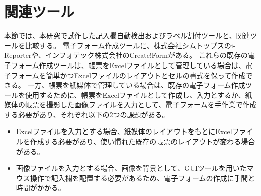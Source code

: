 






\section{関連ツール}\label{sec:relation_tools}
本節では、本研究で試作した記入欄自動検出およびラベル割付ツールと、関連ツールを比較する。
電子フォーム作成ツールに、株式会社シムトップスのi-Reporter\cite{i-Reporter}や、インフォテック株式会社のCreate!Form\cite{Create!Form}がある。
これらの既存の電子フォーム作成ツールは、帳票をExcelファイルとして管理している場合は、電子フォームを簡単かつExcelファイルのレイアウトとセルの書式を保って作成できる。
一方、帳票を紙媒体で管理している場合は、既存の電子フォーム作成ツールを使用するために、帳票をExcelファイルとして作成し、入力とするか、紙媒体の帳票を撮影した画像ファイルを入力として、電子フォームを手作業で作成する必要があり、それぞれ以下の2つの課題がある。

\begin{itemize}
    \item Excelファイルを入力とする場合、紙媒体のレイアウトをもとにExcelファイルを作成する必要があり、使い慣れた既存の帳票のレイアウトが変わる場合がある。
    \item 画像ファイルを入力とする場合、画像を背景として、GUIツールを用いたマウス操作で記入欄を配置する必要があるため、電子フォームの作成に手間と時間がかかる。
  \end{itemize}

